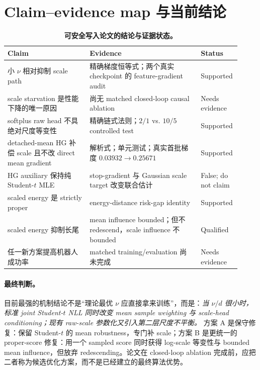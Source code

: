 \documentclass[10pt]{article}
\begin{document}
\section{Claim--evidence map 与当前结论}

\begin{table}[h]
\centering
\caption{\textbf{可安全写入论文的结论与证据状态。}}
\small
\begin{tabularx}{\linewidth}{@{}p{0.34\linewidth}p{0.46\linewidth}p{0.12\linewidth}@{}}
\toprule
Claim & Evidence & Status \\
\midrule
小 $\nu$ 相对抑制 scale path & 精确梯度恒等式；两个真实 checkpoint 的 feature-gradient audit & Supported \\
scale starvation 是性能下降的唯一原因 & 尚无 matched closed-loop causal ablation & Needs evidence \\
softplus raw head 不具绝对尺度等变性 & 精确链式法则；$2/1$ vs. $10/5$ controlled test & Supported \\
detached-mean HG 补偿 scale 且不改 direct mean gradient & 解析式；单元测试；真实首批梯度 $0.03932\to0.25671$ & Supported \\
HG auxiliary 保持纯 Student-$t$ MLE & stop-gradient 与 Gaussian scale target 改变联合估计 & False; do not claim \\
scaled energy 是 strictly proper & energy-distance risk-gap identity & Supported \\
scaled energy 抑制长尾 & mean influence bounded；但不 redescend，scale influence 不 bounded & Qualified \\
任一新方案提高机器人成功率 & matched training/evaluation 尚未完成 & Needs evidence \\
\bottomrule
\end{tabularx}
\end{table}

\paragraph{最终判断。}
目前最强的机制结论不是“理论最优 $\nu$ 应直接拿来训练”，而是：\emph{当 $\nu/d$ 很小时，标准 joint Student-$t$ NLL 同时改变 mean sample weighting 与 scale-head conditioning；现有 raw-scale 参数化又引入第二层尺度不平衡。} 方案 A 是保守修复：保留 Student-$t$ 的 mean robustness，专门补 scale；方案 B 是更统一的 proper-score 修复：用一个 sampled score 同时获得 log-scale 等变性与 bounded mean influence，但放弃 redescending。论文在 closed-loop ablation 完成前，应把二者称为候选优化方案，而不是已经建立的最终算法优势。
\end{document}
